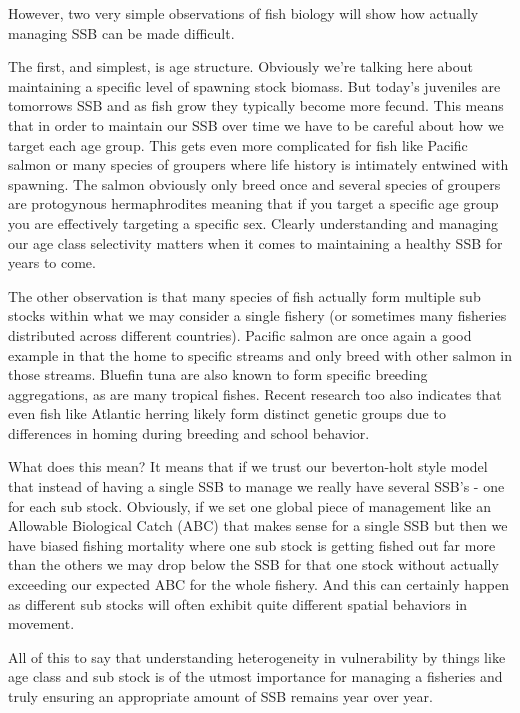 \documentclass[11pt]{article}
\begin{document}
However, two very simple observations of fish biology will show how actually managing SSB can be made difficult.

The first, and simplest, is age structure. Obviously we're talking here about maintaining a specific level of spawning stock biomass. But today's juveniles are tomorrows SSB and as fish grow they typically become more fecund. This means that in order to maintain our SSB over time we have to be careful about how we target each age group. This gets even more complicated for fish like Pacific salmon or many species of groupers where life history is intimately entwined with spawning. The salmon obviously only breed once and several species of groupers are protogynous hermaphrodites meaning that if you target a specific age group you are effectively targeting a specific sex. Clearly understanding and managing our age class selectivity matters when it comes to maintaining a healthy SSB for years to come. \newline

The other observation is that many species of fish actually form multiple sub stocks within what we may consider a single fishery (or sometimes many fisheries distributed across different countries). Pacific salmon are once again a good example in that the home to specific streams and only breed with other salmon in those streams. Bluefin tuna are also known to form specific breeding aggregations, as are many tropical fishes. Recent research too also indicates that even fish like Atlantic herring likely form distinct genetic groups due to differences in homing during breeding and school behavior. 

What does this mean? It means that if we trust our beverton-holt style model that instead of having a single SSB to manage we really have several SSB's - one for each sub stock. Obviously, if we set one global piece of management like an Allowable Biological Catch (ABC) that makes sense for a single SSB but then we have biased fishing mortality where one sub stock is getting fished out far more than the others we may drop below the SSB for that one stock without actually exceeding our expected ABC for the whole fishery. And this can certainly happen as different sub stocks will often exhibit quite different spatial behaviors in movement. \newline

All of this to say that understanding heterogeneity in vulnerability by things like age class and sub stock is of the utmost importance for managing a fisheries and truly ensuring an appropriate amount of SSB remains year over year. 
\end{document}
